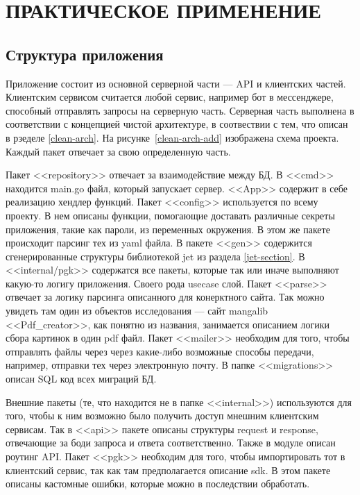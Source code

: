 \section{ПРАКТИЧЕСКОЕ ПРИМЕНЕНИЕ}

\subsection{Структура приложения}
Приложение состоит из основной серверной части --- API и клиентских частей. 
Клиентским сервисом считается любой сервис, например бот в мессенджере, способный отправлять запросы на серверную часть.
Серверная часть выполнена в соответствии с концепцией чистой архитектуре, в соотвествии с тем, что описан в рзеделе \ref{clean-arch}.
На рисунке~\ref{clean-arch-add} изображена схема проекта.
Каждый пакет отвечает за свою определенную часть.

Пакет <<repository>> отвечает за взаимодействие между БД. В <<cmd>> находится main.go файл, который запускает сервер.
<<App>> содержит в себе реализацию хендлер функций. Пакет <<config>> используется по всему проекту. 
В нем описаны функции, помогающие доставать различные секреты приложения, такие как пароли, из переменных окружения.
В этом же пакете происходит парсинг тех из yaml файла.
В пакете <<gen>> содержится сгенерированные структуры библиотекой jet из раздела \ref{jet-section}. 
В <<internal/pgk>> содержатся все пакеты, которые так или иначе выполняют какую-то логигу приложения.
Своего рода usecase слой.
Пакет <<parse>> отвечает за логику парсинга описанного для конерктного сайта. Так можно увидеть там один из объектов исследования --- сайт mangalib
<<Pdf\_creator>>, как понятно из названия, занимается описанием логики сбора картинок в один pdf файл.
Пакет <<mailer>> необходим для того, чтобы отправлять файлы через через какие-либо возможные способы передачи, например, отправки тех через электронную почту.
В папке <<migrations>> описан SQL код всех миграций БД.

Внешние пакеты (те, что находится не в папке <<internal>>) используются для того, чтобы к ним возможно было получить доступ мнешним клиентским сервисам.
Так в <<api>> пакете описаны структуры request и response, отвечающие за боди запроса и ответа соответственно.
Также в модуле описан роутинг API. 
Пакет <<pgk>> необходим для того, чтобы импортировать тот в клиентский сервис, так как там предполагается описание sdk.
В этом пакете описаны кастомные ошибки, которые можно в последствии обработать.